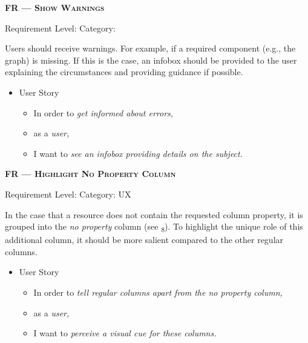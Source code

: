 \centerline{\textbf{FR\textsubscript{} --- \textsc{Show Warnings}}}
\centerline{\small Requirement Level:  \quad{} Category: }

\noindent Users should receive warnings. For example, if a required component (e.g., the graph) is missing. If this is the case, an infobox should be provided to the user explaining the circumstances and providing guidance if possible. 


\begin{itemize}[after=\vspace{1em}]
    \setlength\itemsep{-0.5em}
	\item[] User Story\\[-7.8mm]
	\begin{itemize}
    \setlength\itemsep{-0.5em}
        \item[] In order to \textit{get informed about errors,}
        \item[] as a \textit{user,}
        \item[] I want to \textit{see an infobox providing details on the subject.}
    \end{itemize}
\end{itemize}


\centerline{\textbf{FR\textsubscript{} --- \textsc{Highlight No Property Column}}}
\centerline{\small Requirement Level:  \quad{} Category: \acrshort*{UX}}

\noindent In the case that a resource does not contain the requested column property, it is grouped into the \textit{no property} column (see \textsubscript{8}). To highlight the unique role of this additional column, it should be more salient compared to the other regular columns. 

\begin{itemize}[after=\vspace{1em}]
    \setlength\itemsep{-0.5em}
	\item[] User Story\\[-7.8mm]
	\begin{itemize}
    \setlength\itemsep{-0.5em}
        \item[] In order to \textit{tell regular columns apart from the no property column,}
        \item[] as a \textit{user,}
        \item[] I want to \textit{perceive a visual cue for these columns.}
    \end{itemize}
\end{itemize}






